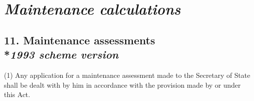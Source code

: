 \documentclass[12pt,a4paper]{article}
\begin{document}
\section{\itshape 
\emph{Maintenance calculations}  %
}

\subsection[11. Maintenance assessments --- \emph{1993 scheme version}]{11. Maintenance assessments\\*\emph{1993 scheme version}}

(1) Any application for a maintenance assessment made to the Secretary of State shall be 
dealt with by him  %
in accordance with the provision made by or under this Act.

%
%
%
%
%
\end{document}
